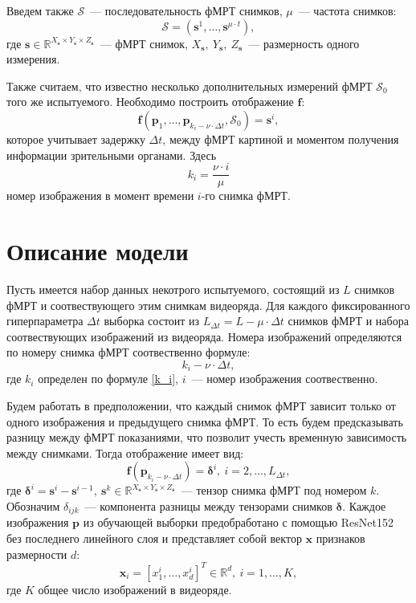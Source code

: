 \documentclass[12pt,twoside]{article}
\begin{document}
Введем также $\mathcal{S}$~--- последовательность фМРТ снимков,  $\mu$~--- частота снимков:
\begin{equation}
    \mathcal{S} = (\bm{s}^{1}, \dots, \bm{s}^{\mu \cdot t}),
\end{equation}
где $\bm{s} \in \mathbb{R}^{X_{\bm{s}} \times Y_{\bm{s}} \times Z_{\bm{s}}}$~--- фМРТ снимок, $X_{\bm{s}},~Y_{\bm{s}},~Z_{\bm{s}}$~--- размерность одного измерения.

Также считаем, что известно несколько дополнительных измерений фМРТ $\mathcal{S}_0$ того же испытуемого.
Необходимо построить отображение $\bm{f}$:
\begin{equation}
    \bm{f}(\bm{p}_{1}, \dots, \bm{p}_{k_i - \nu \cdot \Delta t}, \mathcal{S}_0) = \bm{s}^i,
\end{equation}
которое учитывает задержку $\Delta t$, между фМРТ картиной и моментом получения информации зрительными органами.
Здесь
\begin{equation}
    \label{k_i}
    k_i = \dfrac{\nu \cdot i}{\mu}
\end{equation}
номер изображения в момент времени $i$-го снимка фМРТ.

\section{Описание модели}
Пусть имеется набор данных некотрого испытуемого, состоящий из $L$ снимков фМРТ и соотвествующего этим снимкам видеоряда.
Для каждого фиксированного гиперпараметра $\Delta t$ выборка состоит из $L_{\Delta t} = L - \mu \cdot \Delta t$  снимков фМРТ и набора соотвествующих изображений из видеоряда. 
Номера изображений определяются по номеру снимка фМРТ соотвественно формуле:
\begin{equation}
    k_i - \nu \cdot \Delta t,
\end{equation}
где $k_i$ определен по формуле \eqref{k_i}, $i$~--- номер изображения соотвественно.

Будем работать в предположении, что каждый снимок фМРТ зависит только от одного изображения и предыдущего снимка фМРТ. 
То есть будем предсказывать разницу между фМРТ показаниями, что позволит учесть временную зависимость между снимками.
Тогда отображение имеет вид:
\begin{equation}
	\label{main_model}
	\bm{f}(\bm{p}_{k_i - \nu \cdot \Delta t}) = \bm{\delta}^i, \ i = 2, \ldots, L_{\Delta t},
\end{equation}
где $\bm{\delta}^i = \bm{s}^i - \bm{s}^{i-1},~\bm{s}^k \in \mathbb{R}^{X_{\bm{s}} \times Y_{\bm{s}} \times Z_{\bm{s}}}$~--- тензор снимка фМРТ под номером $k$.
Обозначим $\delta_{ijk}$~--- компонента разницы между тензорами снимков $\bm{\delta}$.
Каждое изображения $\bm{p}$ из обучающей выборки предобработано с помощью ResNet152 без последнего линейного слоя и представляет собой вектор $\bm{x}$ признаков размерности $d$:
\[ \bm{x}_i = [x^i_1, \ldots, x^i_{d}]^{T} \in \mathbb{R}^{d}, \ i = 1, \ldots, K, \]
где $K$ общее число изображений в видеоряде.
\end{document}
